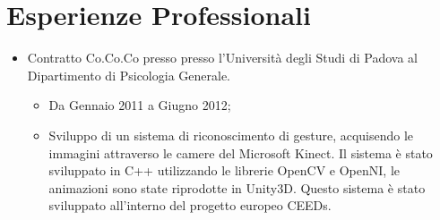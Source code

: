 \documentclass[pdftex,a4paper,10pt,twoside,titlepage,italian,openright]{article}
\begin{document}
\section*{Esperienze Professionali}
\begin{itemize}
	\item Contratto Co.Co.Co presso  presso l'Università degli Studi di Padova al Dipartimento di Psicologia Generale. 
		 \begin{itemize}
	 	\item Da Gennaio 2011 a Giugno 2012;
	 	\item  Sviluppo di un sistema di riconoscimento di gesture, acquisendo le immagini attraverso le camere del Microsoft Kinect. 
	 	Il sistema è stato 	sviluppato in C++ utilizzando le librerie OpenCV e OpenNI,  le animazioni sono state riprodotte in Unity3D. 
	 	Questo sistema è stato sviluppato all'interno del progetto europeo CEEDs.
	 \end{itemize}
\end{itemize}
\end{document}

